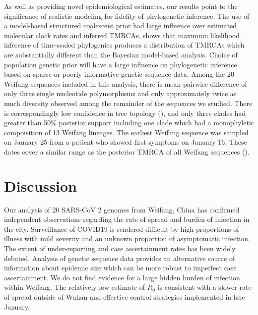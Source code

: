 \documentclass[9pt,lineno,onehalfspacing]{elife}
\begin{document}
As well as providing novel epidemiological estimates, our results point to the significance of realistic modeling for fidelity of phylogenetic inference.
The use of a model-based structured coalescent prior had large influence over estimated molecular clock rates and inferred TMRCAs. 
 shows that maximum likelihood inference of time-scaled phylogenies produces a distribution of TMRCAs which are substantially different than the Bayesian model-based analysis.
Choice of population genetic prior will have a large influence on phylogenetic inference based on sparse or poorly informative genetic sequence data. 
Among the 20 Weifang sequences included in this analysis, there is mean pairwise difference of only three single nucleotide polymorphisms and only approximately twice as much diversity observed among the remainder of the sequences we studied. 
There is correspondingly low confidence in tree topology (), and only three clades had greater than 50\% posterior support including one clade which had a monophyletic compoisition of 13 Weifang lineages. 
The earliest Weifang sequence was sampled on January 25 from a patient who showed first symptoms on January 16. These dates cover a similar range as the posterior TMRCA of all Weifang sequences ().


\section{Discussion}

Our analysis of 20 SARS-CoV 2 genomes from Weifang, China has confirmed independent observations regarding the rate of spread and burden of infection in the city.
Surveillance of COVID19 is rendered difficult by high proportions of illness with mild severity and an unknown proportion of asymptomatic infection\citep{Guan2020-ql}. 
The extent of under-reporting and case ascertainment rates has been widely debated. 
Analysis of genetic sequence data provides an alternative source of information about epidemic size which can be more robust to imperfect case ascertainment. 
We do not find evidence for a large hidden burden of infection within Weifang. 
The relatively low estimate of $R_0$ is consistent with a slower rate of spread outside of Wuhan and effective control strategies implemented in late January. 
\end{document}
